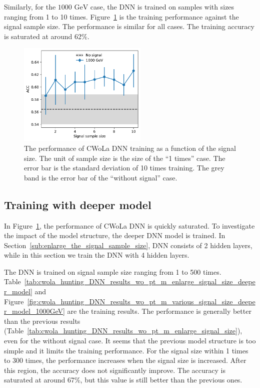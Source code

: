 \documentclass[12pt]{article}
\begin{document}
		Similarly, for the $\text{1000 GeV}$ case, the DNN is trained on samples with sizes ranging from 1 to 10 times. Figure~\ref{fig:cwola_hunting_DNN_results_wo_pt_m_various_signal_size_1000GeV} is the training performance against the signal sample size. The performance is similar for all cases. The training accuracy is saturated at around 62\%.
		\begin{figure}[htpb]
			\centering
			\includegraphics[width=0.55\textwidth]{ACC_vs_signal_sample_size-1000GeV.pdf}
			\caption{The performance of CWoLa DNN training as a function of the signal size. The unit of sample size is the size of the ``1 times'' case. The error bar is the standard deviation of 10 times training. The grey band is the error bar of the ``without signal'' case.}
			\label{fig:cwola_hunting_DNN_results_wo_pt_m_various_signal_size_1000GeV}
		\end{figure}

	\subsection{Training with deeper model}%
	\label{sub:training_with_deeper_model}
		In Figure~\ref{fig:cwola_hunting_DNN_results_wo_pt_m_various_signal_size_1000GeV}, the performance of CWoLa DNN is quickly saturated. To investigate the impact of the model structure, the deeper DNN model is trained. In Section~\ref{sub:enlarge_the_signal_sample_size}, DNN consists of 2 hidden layers, while in this section we train the DNN with 4 hidden layers.

		The DNN is trained on signal sample size ranging from 1 to 500 times. Table~\ref{tab:cwola_hunting_DNN_results_wo_pt_m_enlarge_signal_size_deeper_model} and Figure~\ref{fig:cwola_hunting_DNN_results_wo_pt_m_various_signal_size_deeper_model_1000GeV} are the training results. The performance is generally better than the previous results (Table~\ref{tab:cwola_hunting_DNN_results_wo_pt_m_enlarge_signal_size}), even for the without signal case. It seems that the previous model structure is too simple and it limits the training performance. For the signal size within 1 times to 300 times, the performance increases when the signal size is increased. After this region, the accuracy does not significantly improve. The accuracy is saturated at around 67\%, but this value is still better than the previous ones.
\end{document}
